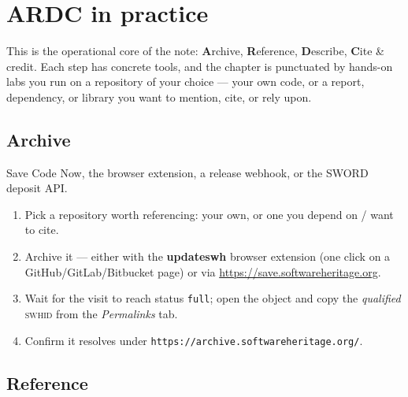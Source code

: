 \chapter{ARDC in practice}
\label{ch:ardc}

This is the operational core of the note: \textbf{A}rchive, \textbf{R}eference,
\textbf{D}escribe, \textbf{C}ite \& credit. Each step has concrete tools, and the chapter is
punctuated by hands-on labs you run on a repository of your choice --- your own code, or a
report, dependency, or library you want to mention, cite, or rely upon.


\section{Archive}
Save Code Now, the browser extension, a release webhook, or the SWORD deposit API.

\begin{handson}
\begin{enumerate}[nosep,leftmargin=*]
  \item Pick a repository worth referencing: your own, or one you depend on / want to cite.
  \item Archive it --- either with the \textbf{updateswh} browser extension (one click on a
        GitHub/GitLab/Bitbucket page) or via \url{https://save.softwareheritage.org}.
  \item Wait for the visit to reach status \texttt{full}; open the object and copy the
        \emph{qualified} \textsc{swhid} from the \emph{Permalinks} tab.
  \item Confirm it resolves under \texttt{https://archive.softwareheritage.org/}.
\end{enumerate}
\end{handson}


\section{Reference}

